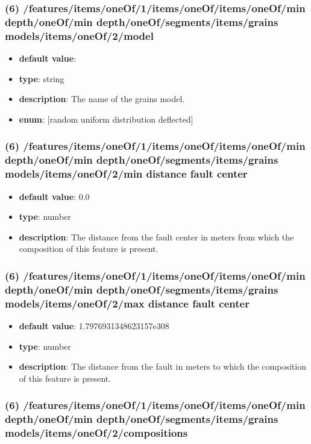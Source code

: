 \subsubsection{(6) /features/items/oneOf/1/items/oneOf/items/oneOf/min depth/oneOf/min depth/oneOf/segments/items/grains models/items/oneOf/2/model}
\begin{itemize}[leftmargin=6em]\item {\bf default value}: 
\item {\bf type}: string
\item {\bf description}: The name of the grains model.
\item {\bf enum}: [random uniform distribution deflected]\end{itemize}\subsubsection{(6) /features/items/oneOf/1/items/oneOf/items/oneOf/min depth/oneOf/min depth/oneOf/segments/items/grains models/items/oneOf/2/min distance fault center}
\begin{itemize}[leftmargin=6em]\item {\bf default value}: 0.0
\item {\bf type}: number
\item {\bf description}: The distance from the fault center in meters from which the composition of this feature is present.
\end{itemize}\subsubsection{(6) /features/items/oneOf/1/items/oneOf/items/oneOf/min depth/oneOf/min depth/oneOf/segments/items/grains models/items/oneOf/2/max distance fault center}
\begin{itemize}[leftmargin=6em]\item {\bf default value}: 1.7976931348623157e308
\item {\bf type}: number
\item {\bf description}: The distance from the fault in meters to which the composition of this feature is present.
\end{itemize}\subsubsection{(6) /features/items/oneOf/1/items/oneOf/items/oneOf/min depth/oneOf/min depth/oneOf/segments/items/grains models/items/oneOf/2/compositions}

